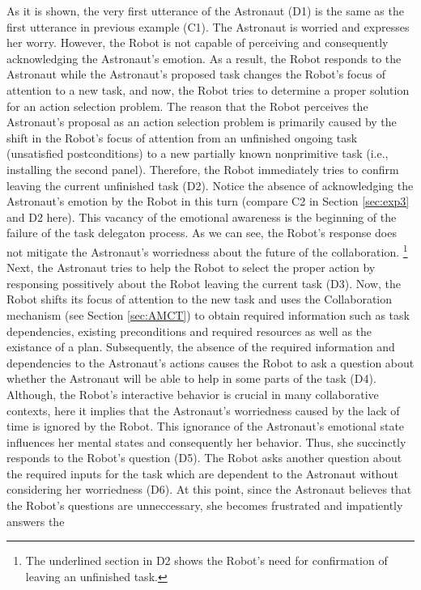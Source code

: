 As it is shown, the very first utterance of the Astronaut (D1) is the same as
the first utterance in previous example (C1). The Astronaut is worried and
expresses her worry. However, the Robot is not capable of perceiving and
consequently acknowledging the Astronaut's emotion. As a result, the Robot
responds to the Astronaut while the Astronaut's proposed task changes the
Robot's focus of attention to a new task, and now, the Robot tries to determine
a proper solution for an action selection problem. The reason that the Robot
perceives the Astronaut's proposal as an action selection problem is primarily
caused by the shift in the Robot's focus of attention from an unfinished ongoing
task (unsatisfied postconditions) to a new partially known nonprimitive task
(i.e., installing the second panel). Therefore, the Robot immediately tries to
confirm leaving the current unfinished task (D2). Notice the absence of
acknowledging the Astronaut's emotion by the Robot in this turn (compare C2 in
Section \ref{sec:exp3} and D2 here). This vacancy of the emotional awareness is
the beginning of the failure of the task delegaton process. As we can see, the
Robot's response does not mitigate the Astronaut's worriedness about the future
of the collaboration. \footnote{The underlined section in D2 shows the Robot's
need for confirmation of leaving an unfinished task.} Next, the Astronaut tries
to help the Robot to select the proper action by responsing possitively about
the Robot leaving the current task (D3). Now, the Robot shifts its focus of
attention to the new task and uses the Collaboration mechanism (see Section
\ref{sec:AMCT}) to obtain required information such as task dependencies,
existing preconditions and required resources as well as the existance of a
plan. Subsequently, the absence of the required information and dependencies to
the Astronaut's actions causes the Robot to ask a question about whether the
Astronaut will be able to help in some parts of the task (D4). Although, the
Robot's interactive behavior is crucial in many collaborative contexts, here it
implies that the Astronaut's worriedness caused by the lack of time is ignored
by the Robot. This ignorance of the Astronaut's emotional state influences her
mental states and consequently her behavior. Thus, she succinctly responds to
the Robot's question (D5). The Robot asks another question about the required
inputs for the task which are dependent to the Astronaut without considering her
worriedness (D6). At this point, since the Astronaut believes that the Robot's
questions are unneccessary, she becomes frustrated and impatiently answers the
